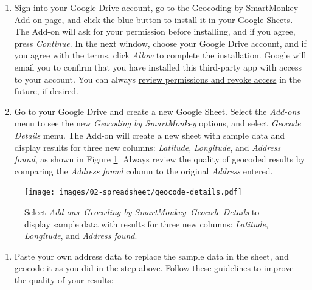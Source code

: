 \documentclass[
  english,
]{book}
\providecommand{\tightlist}{%
  \setlength{\itemsep}{0pt}\setlength{\parskip}{0pt}}
\begin{document}
\begin{enumerate}
\def\labelenumi{\arabic{enumi}.}
\item
  Sign into your Google Drive account, go to the \href{https://gsuite.google.com/marketplace/app/geocoding_by_smartmonkey/1033231575312}{Geocoding by SmartMonkey Add-on page}, and click the blue button to install it in your Google Sheets. The Add-on will ask for your permission before installing, and if you agree, press \emph{Continue}. In the next window, choose your Google Drive account, and if you agree with the terms, click \emph{Allow} to complete the installation. Google will email you to confirm that you have installed this third-party app with access to your account. You can always \href{https://myaccount.google.com/permissions}{review permissions and revoke access} in the future, if desired.
\item
  Go to your \href{https://drive.google.com}{Google Drive} and create a new Google Sheet. Select the \emph{Add-ons} menu to see the new \emph{Geocoding by SmartMonkey} options, and select \emph{Geocode Details} menu. The Add-on will create a new sheet with sample data and display results for three new columns: \emph{Latitude}, \emph{Longitude}, and \emph{Address found}, as shown in Figure \ref{fig:geocode-details}. Always review the quality of geocoded results by comparing the \emph{Address found} column to the original \emph{Address} entered.
\end{enumerate}



\begin{figure}
\centering
\texttt{[image: images/02-spreadsheet/geocode-details.pdf]}
\caption{\label{fig:geocode-details}Select \emph{Add-ons--Geocoding by SmartMonkey--Geocode Details} to display sample data with results for three new columns: \emph{Latitude}, \emph{Longitude}, and \emph{Address found}.}
\end{figure}

\begin{enumerate}
\def\labelenumi{\arabic{enumi}.}
\setcounter{enumi}{2}
\tightlist
\item
  Paste your own address data to replace the sample data in the sheet, and geocode it as you did in the step above. Follow these guidelines to improve the quality of your results:
\end{enumerate}
\end{document}

